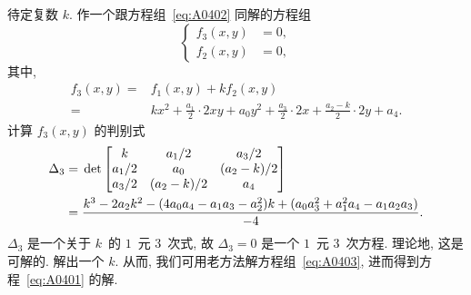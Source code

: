 \documentclass[../libro.tex]{subfiles}
\begin{document}
待定复数 \(k\).
作一个跟方程组~\eqref{eq:A0402} 同解的方程组
\begin{equation}
    \left\{ %
    \begin{aligned}
        f_3 (x, y) & = 0, \\
        f_2 (x, y) & = 0,
    \end{aligned}
    \right. %
    \label{eq:A0403}
\end{equation}
其中,
\begin{align*}
    f_3 (x, y)
    = {} &
    f_1 (x, y) + k f_2 (x, y)
    \\
    = {} &
    k x^2
    + \frac{a_1}{2} \cdot 2xy
    + a_0 y^2
    + \frac{a_3}{2} \cdot 2x
    + \frac{a_2 - k}{2} \cdot 2y
    + a_4.
\end{align*}
计算 \(f_3 (x, y)\) 的判别式
\begin{align*}
    \Delta_3
    = {} &
     \det
    \begin{bmatrix}
        k     & a_1/2     & a_3/2     \\
        a_1/2 & a_0       & (a_2-k)/2 \\
        a_3/2 & (a_2-k)/2 & a_4       \\
    \end{bmatrix} 
    \\
    = {} &
    \frac{k^3 - 2 a_2 k^2 - (4 a_0 a_4 - a_1 a_3 - a_2^2) k
    + (a_0 a_3^2 + a_1^2 a_4 - a_1 a_2 a_3)}{-4}.
\end{align*}
\(\Delta_3\) 是一个关于 \(k\)~的 \(1\)~元 \(3\)~次式,
故 \(\Delta_3 = 0\) 是一个 \(1\)~元 \(3\)~次方程.
理论地, 这是可解的.
解出一个 \(k\).
从而, 我们可用老方法解方程组~\eqref{eq:A0403},
进而得到方程~\eqref{eq:A0401} 的解.
\end{document}
